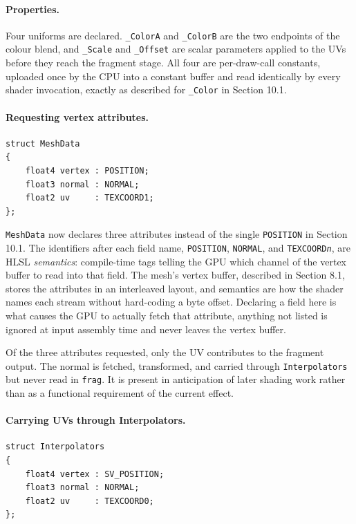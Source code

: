 \documentclass[11pt]{article}
\begin{document}
\paragraph{Properties.}

Four uniforms are declared. \texttt{\_ColorA} and \texttt{\_ColorB} are the two endpoints of the colour blend, and \texttt{\_Scale} and \texttt{\_Offset} are scalar parameters applied to the UVs before they reach the fragment stage. All four are per-draw-call constants, uploaded once by the CPU into a constant buffer and read identically by every shader invocation, exactly as described for \texttt{\_Color} in Section 10.1.

\paragraph{Requesting vertex attributes.}

\begin{lstlisting}
struct MeshData
{
    float4 vertex : POSITION;
    float3 normal : NORMAL;
    float2 uv     : TEXCOORD1;
};
\end{lstlisting}

\texttt{MeshData} now declares three attributes instead of the single \texttt{POSITION} in Section 10.1. The identifiers after each field name, \texttt{POSITION}, \texttt{NORMAL}, and \texttt{TEXCOORD\textit{n}}, are HLSL \emph{semantics}: compile-time tags telling the GPU which channel of the vertex buffer to read into that field. The mesh's vertex buffer, described in Section 8.1, stores the attributes in an interleaved layout, and semantics are how the shader names each stream without hard-coding a byte offset. Declaring a field here is what causes the GPU to actually fetch that attribute, anything not listed is ignored at input assembly time and never leaves the vertex buffer.

Of the three attributes requested, only the UV contributes to the fragment output. The normal is fetched, transformed, and carried through \texttt{Interpolators} but never read in \texttt{frag}. It is present in anticipation of later shading work rather than as a functional requirement of the current effect.

\paragraph{Carrying UVs through Interpolators.}

\begin{lstlisting}
struct Interpolators
{
    float4 vertex : SV_POSITION;
    float3 normal : NORMAL;
    float2 uv     : TEXCOORD0;
};
\end{lstlisting}
\end{document}
